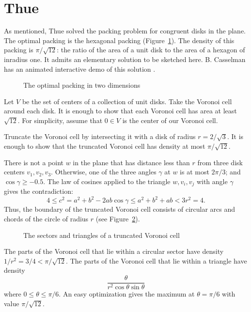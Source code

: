 \section{Thue}\label{sec:thue}


As mentioned, Thue solved the packing problem for congruent disks in
the plane.  The optimal packing is the hexagonal packing
(Figure~\ref{fig:2D-hex}).  The density of this packing is
$\pi/\sqrt{12}$: the ratio of the area of a unit disk to the area of a
hexagon of inradius one.  It admits an elementary solution to be
sketched here.  B. Casselman has an animated interactive demo of this
solution \cite{casselman:pennies}.

\begin{figure}[htb]
  \centering
  \caption{The optimal packing in two dimensions}
  \label{fig:2D-hex}
\end{figure}

Let $V$ be the set of centers of a collection of unit disks.  Take the
Voronoi cell around each disk.  It is enough to show that each Voronoi
cell has area at least $\sqrt{12}$.  For simplicity, assume that $0\in
V$ is the center of our Voronoi cell.

Truncate the Voronoi cell by intersecting it with a disk of radius
$r=2/\sqrt3$.  It is enough to show that the truncated Voronoi cell
has density at most $\pi/\sqrt{12}$.

There is not a point $w$ in the plane that has distance less than $r$
from three disk centers $v_1,v_2,v_3$.  Otherwise, one of the three
angles $\gamma$ at $w$ is at most $2\pi/3$; and $\cos\gamma\ge -0.5$.
The law of cosines applied to the triangle $w,v_i,v_j$ with angle
$\gamma$ gives the contradiction:
   \begin{displaymath}
   4 \le c^2 = a^2 + b^2 - 2 a b \cos\gamma 
   \le a^2 + b^2 + a b < 3r^2 = 4.
   \end{displaymath}
Thus, the boundary of the truncated Voronoi cell consists of circular
arcs and chords of the circle of radius $r$ (see Figure~\ref{fig:2D-proof}).

\begin{figure}[htb]
  \centering
  \caption{The sectors and triangles of a truncated Voronoi cell}
  \label{fig:2D-proof}
\end{figure}

The parts of the Voronoi cell that lie within a circular sector have
density $1/r^2 = 3/4 < \pi/\sqrt{12}$.  The parts of the Voronoi cell
that lie within a triangle have density
   \begin{equation}\label{eqn:rog2d}
   \frac{\theta}{r^2 \cos\theta\sin\theta}
   \end{equation}
where $0 \le \theta\le \pi/6$.  An easy optimization gives the maximum
at $\theta=\pi/6$ with value $\pi/\sqrt{12}$.

